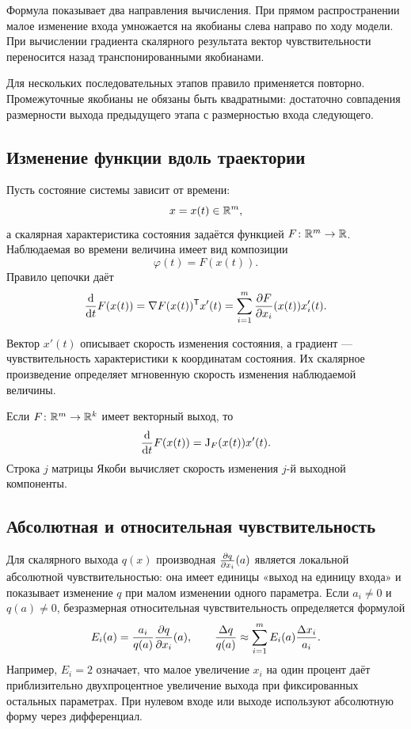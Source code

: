 Формула показывает два направления вычисления. При прямом распространении малое изменение входа умножается на якобианы слева направо по ходу модели. При вычислении градиента скалярного результата вектор чувствительности переносится назад транспонированными якобианами.

Для нескольких последовательных этапов правило применяется повторно. Промежуточные якобианы не обязаны быть квадратными: достаточно совпадения размерности выхода предыдущего этапа с размерностью входа следующего.

\subsection{Изменение функции вдоль траектории}

Пусть состояние системы зависит от времени:
\[
x=x(t)\in\mathbb{R}^m,
\]
а скалярная характеристика состояния задаётся функцией \(F\colon\mathbb{R}^m\to\mathbb{R}\). Наблюдаемая во времени величина имеет вид композиции
\[
\varphi(t)=F(x(t)).
\]
Правило цепочки даёт
\begin{equation}
\frac{\mathop{}\!\mathrm{d} }{\mathop{}\!\mathrm{d} t}F(x(t))
=
\nabla F(x(t))^{\mathsf{T}}x'(t)
=
\sum_{i=1}^{m}
\frac{\partial F}{\partial x_i}(x(t))x_i'(t).
\label{eq:trajectory-chain-rule}
\end{equation}

Вектор \(x'(t)\) описывает скорость изменения состояния, а градиент --- чувствительность характеристики к координатам состояния. Их скалярное произведение определяет мгновенную скорость изменения наблюдаемой величины.

Если \(F\colon\mathbb{R}^m\to\mathbb{R}^k\) имеет векторный выход, то
\begin{equation}
\frac{\mathop{}\!\mathrm{d} }{\mathop{}\!\mathrm{d} t}F(x(t))
=
\mathrm{J}_{F}(x(t))x'(t).
\label{eq:vector-trajectory-chain-rule}
\end{equation}
Строка \(j\) матрицы Якоби вычисляет скорость изменения \(j\)-й выходной компоненты.

\subsection{Абсолютная и относительная чувствительность}

Для скалярного выхода \(q(x)\) производная \(\frac{\partial q}{\partial x_i}(a)\) является локальной абсолютной чувствительностью: она имеет единицы «выход на единицу входа» и показывает изменение \(q\) при малом изменении одного параметра. Если \(a_i\neq0\) и \(q(a)\neq0\), безразмерная относительная чувствительность определяется формулой
\begin{equation}
E_i(a)=\frac{a_i}{q(a)}\frac{\partial q}{\partial x_i}(a),
\qquad
\frac{\Delta q}{q(a)}
\approx
\sum_{i=1}^{m}E_i(a)\frac{\Delta x_i}{a_i}.
\label{eq:relative-sensitivity}
\end{equation}
Например, \(E_i=2\) означает, что малое увеличение \(x_i\) на один процент даёт приблизительно двухпроцентное увеличение выхода при фиксированных остальных параметрах. При нулевом входе или выходе используют абсолютную форму через дифференциал.

